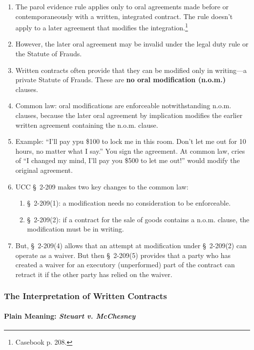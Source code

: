 \begin{enumerate}
    \item The parol evidence rule applies only to oral agreements made before 
    or contemporaneously with a written, integrated contract. The rule doesn't 
    apply to a later agreement that modifies the 
    integration.\footnote{Casebook p. 208.}
    \item However, the later oral agreement may be invalid under the legal 
    duty rule or the Statute of Frauds.
    \item Written contracts often provide that they can be modified only in 
    writing---a private Statute of Frauds. These are \textbf{no oral 
    modification (n.o.m.)} clauses.
    \item Common law: oral modifications are enforceable notwithstanding 
    n.o.m. clauses, because the later oral agreement by implication modifies 
    the earlier written agreement containing the n.o.m. clause.
    \item Example: ``I'll pay ypu \$100 to lock me in this room. Don't let me 
    out for 10 hours, no matter what I say.'' You sign the agreement. At 
    common law, cries of ``I changed my mind, I'll pay you \$500 to let me 
    out!'' would modify the original agreement.
    \item UCC \S\ 2-209 makes two key changes to the common law:
    \begin{enumerate}
        \item \S\ 2-209(1): a modification needs no consideration to be 
        enforceable.
        \item \S\ 2-209(2): if a contract for the sale of goods contains a 
        n.o.m. clause, the modification must be in writing.
    \end{enumerate}
    \item But, \S\ 2-209(4) allows that an attempt at modification under \S\ 
    2-209(2) can operate as a waiver. But then \S\ 2-209(5) provides that a 
    party who has created a waiver for an executory (unperformed) part of the 
    contract can retract it if the other party has relied on the waiver.
\end{enumerate}

\subsubsection{The Interpretation of Written Contracts}

\paragraph{Plain Meaning: \emph{Steuart v. McChesney}}

